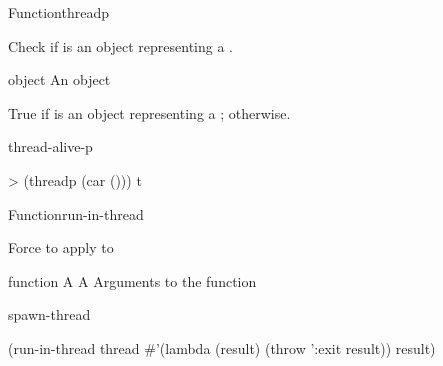 
\begin{functiondoc}{Function}{threadp}{ \returns{}
    }
%

\fnsyntax

\fnpurpose Check if  is an object representing a
.

\fnpackage {}

\fnmodule {}

\fnargs
\begin{args}{object}
\arg[object] An object
\end{args}

\fnreturns True if  is an object representing a 
; \nil{} otherwise.

\begin{alsos}{thread-alive-p}
\end{alsos}

%
\fnexample
\begin{example}
> (threadp (car ()))
t
\end{example}

\end{functiondoc}


\begin{functiondoc}{Function}{run-in-thread}{
     }
%

\fnsyntax

\fnpurpose Force  to apply  to 

\fnpackage {}

\fnmodule {}

\fnargs
\begin{args}{function}
\arg[thread] A 
\arg[function] A 
\arg[args] Arguments to the function
\end{args}

\fnerrors
\nothreads{}

\begin{alsos}{spawn-thread}
\end{alsos}

\fnexample
\begin{example}
  (run-in-thread thread
                 #'(lambda (result) (throw ':exit result)) 
                 result)
\end{example}

\end{functiondoc}

